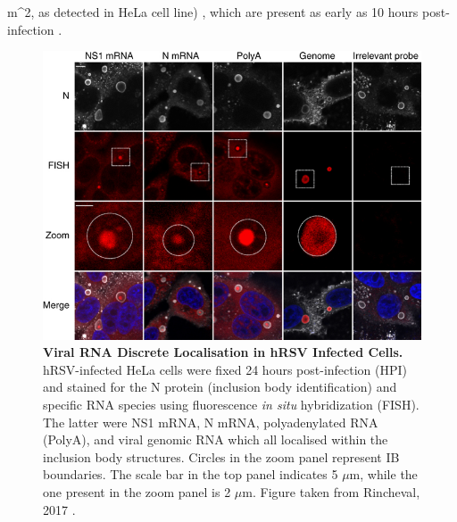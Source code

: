 \mbox{m}^2\), as detected in HeLa cell line) \cite{Rincheval2017FunctionalVirus}, which are present as early as 10 hours post-infection \cite{Jobe2021BovineResponses}.

\begin{figure}
    \centering
    \includegraphics[width=1\linewidth]{04. Introduction/Figs/11. RSV IBs.png}
    \caption[Viral RNA Discrete Localisation in hRSV Infected Cells.]{\textbf{Viral RNA Discrete Localisation in hRSV Infected Cells.} hRSV-infected HeLa cells were fixed 24 hours post-infection (HPI) and stained for the N protein (inclusion body identification) and specific RNA species using fluorescence \textit{in situ} hybridization (FISH). The latter were NS1 mRNA, N mRNA, polyadenylated RNA (PolyA), and viral genomic RNA which all localised within the inclusion body structures. Circles in the zoom panel represent IB boundaries. The scale bar in the top panel indicates 5 \(\mu\)m, while the one present in the zoom panel is 2 \(\mu\)m. Figure taken from Rincheval, 2017 \cite{Rincheval2017FunctionalVirus}.}
    \label{fig:Viral RNA Discrete Localisation in hRSV Infected Cells}
\end{figure}

